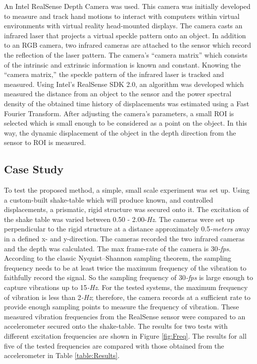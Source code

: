 \documentclass{sigchi}
\begin{document}
An Intel RealSense Depth Camera was used. This camera was initially developed to measure and track hand motions to interact with computers within virtual environments with virtual reality head-mounted displays. The camera casts an infrared laser that projects a virtual speckle pattern onto an object. In addition to an RGB camera, two infrared cameras are attached to the sensor which record the reflection of the laser pattern. The camera's ``camera matrix'' which consists of the intrinsic and extrinsic information is known and constant. Knowing the ``camera matrix,'' the speckle pattern of the infrared laser is tracked and measured. Using Intel's RealSense SDK 2.0, an algorithm was developed which measured the distance from an object to the sensor and the power spectral density of the obtained time history of displacements was estimated using a Fast Fourier Transform. After adjusting the camera's parameters, a small ROI is selected which is small enough to be considered as a point on the object. In this way, the dynamic displacement of the object in the depth direction from the sensor to ROI is measured.

\subsection{Case Study}

To test the proposed method, a simple, small scale experiment was set up. Using a custom-built shake-table which will produce known, and controlled displacements, a prismatic, rigid structure was secured onto it. The excitation of the shake table was varied between 0.50 - 2.00-\textit{Hz}. The cameras were set up perpendicular to the rigid structure at a distance approximately 0.5\textit{-meters} away in a defined x- and y-direction. The cameras recorded the two infrared cameras and the depth was calculated. The max frame-rate of the camera is 30\textit{-fps}. According to the classic Nyquist–Shannon sampling theorem, the sampling frequency needs to be at least twice the maximum frequency of the vibration to faithfully record the signal. So the sampling frequency of 30\textit{-fps} is large enough to capture vibrations up to 15\textit{-Hz}. For the tested systems, the maximum frequency of vibration is less than 2\textit{-Hz}; therefore, the camera records at a sufficient rate to provide enough sampling points to measure the frequency of vibration. These measured vibration frequencies from the RealSense sensor were compared to an accelerometer secured onto the shake-table. The results for two tests with different excitation frequencies are shown in Figure \ref{fig:Freq}. The results for all five of the tested frequencies are compared with those obtained from the accelerometer in Table \ref{table:Results}. 
\end{document}
